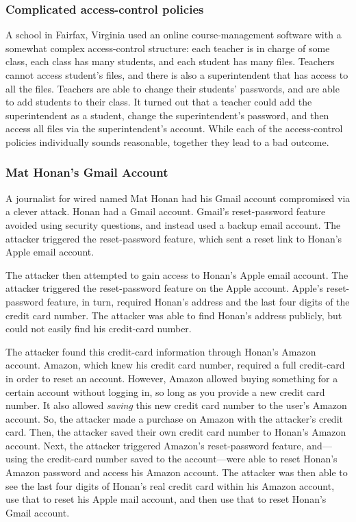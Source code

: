 \subsubsection{Complicated access-control policies}
A school in Fairfax, Virginia used an online
course-management software with a somewhat complex
access-control structure: each teacher is in charge of some
class, each class has many students, and each
student has many files. Teachers cannot access
student's files, and there is also
a superintendent that has access to all the files.
Teachers are able to change their students'
passwords, and are able to add students to their
class. It turned out that a teacher could add the
superintendent as a student, change the
superintendent's password, and then access all
files via the superintendent's account.
While each of the access-control policies individually
sounds reasonable, together they lead to a bad outcome.


\subsubsection{Mat Honan's Gmail Account}
A journalist for wired named Mat Honan had his Gmail account compromised via a clever attack.\autocite{honan}
Honan had a Gmail account.
Gmail's reset-password feature avoided using security questions, and instead used a backup email account.
The attacker triggered the reset-password feature, which sent a reset link
to Honan's Apple email account.

The attacker then attempted to gain access to Honan's Apple email account.
The attacker triggered the reset-password feature on the Apple account.
Apple's reset-password feature, in turn, required Honan's address and the last four digits of the credit card number.
The attacker was able to find Honan's address publicly, but could not easily find his credit-card number.

The attacker found this credit-card information through Honan's Amazon account.
Amazon, which knew his credit card number, required a full credit-card in order to reset an account.
However, Amazon allowed buying something for a certain account without logging in, 
so long as you provide a new credit card number.
It also allowed \textit{saving} this new credit card number to the user's Amazon account.
So, the attacker made a purchase on Amazon with the attacker's credit card.
Then, the attacker saved their own credit card number to Honan's Amazon account.
Next, the attacker triggered Amazon's reset-password feature, and---using the credit-card
number saved to the account---were able to reset Honan's 
Amazon password and access his Amazon account.
The attacker was then able to see the last four
digits of Honan's real credit card within his
Amazon account, use that to reset his Apple mail
account, and then use that to reset Honan's Gmail
account.

